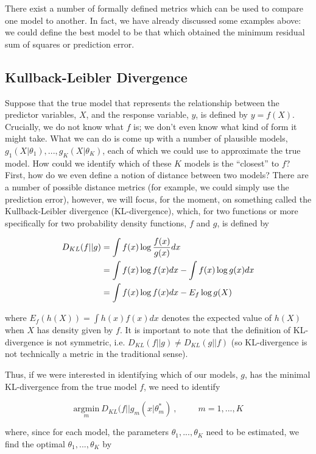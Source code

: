 There exist a number of formally defined metrics which can be used to compare one model to another. In fact, we have already discussed some examples above: we could define the best model to be that which obtained the minimum residual sum of squares or prediction error.

\subsection*{Kullback-Leibler Divergence}

Suppose that the true model that represents the relationship between the predictor variables, $X$, and the response variable, $y$, is defined by $y = f(X)$. Crucially, we do not know what $f$ is; we don't even know what kind of form it might take. What we can do is come up with a number of plausible models, $g_1(X|\theta_1), ..., g_K(X|\theta_K)$, each of which we could use to approximate the true model. How could we identify which of these $K$ models is the ``closest'' to $f$? First, how do we even define a notion of distance between two models? There are a number of possible distance metrics (for example, we could simply use the prediction error), however, we will focus, for the moment, on something called the Kullback-Leibler divergence (KL-divergence), which, for two functions or more specifically for two probability density functions, $f$ and $g$, is defined by

\begin{align}
\label{eq:KL}
D_{KL}(f || g) &= \int f(x) \log \frac{f(x)}{g(x)} dx \notag\\
& = \int f(x) \log f(x) dx - \int f(x) \log g(x) dx \notag \\
& = \int f(x) \log f(x) dx - E_{f} \log g(X)
\end{align}

where $E_f(h(X)) = \int h(x) f(x) dx$ denotes the expected value of $h(X)$ when $X$ has density given by $f$. It is important to note that the definition of KL-divergence is not symmetric, i.e. $D_{KL}(f || g) \neq D_{KL}(g || f)$ (so KL-divergence is not technically a metric in the traditional sense).

Thus, if we were interested in identifying which of our models, $g$, has the minimal KL-divergence from the true model $f$, we need to identify

$$\underset{m}{\text{argmin}} ~D_{KL}(f || g_m(x | \theta^*_m)~, ~~~~~~~~~~~m = 1, ..., K$$

where, since for each model, the parameters $\theta_1, ..., \theta_K$ need to be estimated, we find the optimal $\theta_1, ..., \theta_K$ by

